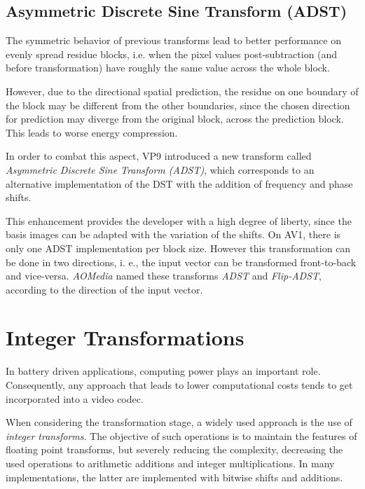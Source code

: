 \subsection{Asymmetric Discrete Sine Transform (ADST)}

\nocite{hanButterflyStructuredDesign2013}
\nocite{bingNextgenerationVideoCoding2015}

The symmetric behavior of previous transforms lead to better performance on evenly spread residue blocks, i.e. when the pixel values post-subtraction (and before transformation) have roughly the same value across the whole block.

However, due to the directional spatial prediction, the residue on one boundary of the block may be different from the other boundaries, since the chosen direction for prediction may diverge from the original block, across the prediction block. This leads to worse energy compression.

In order to combat this aspect, VP9 introduced a new transform called \emph{Asymmetric Discrete Sine Transform (ADST)}, which corresponds to an alternative implementation of the DST with the addition of frequency and phase shifts.

This enhancement provides the developer with a high degree of liberty, since the basis images can be adapted with the variation of the shifts. On AV1, there is only one ADST implementation per block size. However this transformation can be done in two directions, i. e., the input vector can be transformed front-to-back and vice-versa. \emph{AOMedia} named these transforms \emph{ADST} and \emph{Flip-ADST}, according to the direction of the input vector.


\section{Integer Transformations}
\nocite{soo-changpeiIntegerTransformsAnalogous2000}
\nocite{AV1BitstreamDecoding}

In battery driven applications, computing power plays an important role. Consequently, any approach that leads to lower computational costs tends to get incorporated into a video codec.

When considering the transformation stage, a widely used approach is the use of \emph{integer transforms}. The objective of such operations is to maintain the features of floating point transforms, but severely reducing the complexity, decreasing the used operations to arithmetic additions and integer multiplications. In many implementations, the latter are implemented with bitwise shifts and additions.

